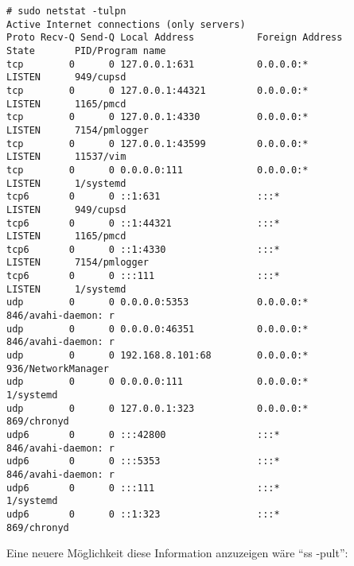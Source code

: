\begin{verbatim}
# sudo netstat -tulpn
Active Internet connections (only servers)
Proto Recv-Q Send-Q Local Address           Foreign Address         State       PID/Program name    
tcp        0      0 127.0.0.1:631           0.0.0.0:*               LISTEN      949/cupsd           
tcp        0      0 127.0.0.1:44321         0.0.0.0:*               LISTEN      1165/pmcd           
tcp        0      0 127.0.0.1:4330          0.0.0.0:*               LISTEN      7154/pmlogger       
tcp        0      0 127.0.0.1:43599         0.0.0.0:*               LISTEN      11537/vim           
tcp        0      0 0.0.0.0:111             0.0.0.0:*               LISTEN      1/systemd           
tcp6       0      0 ::1:631                 :::*                    LISTEN      949/cupsd           
tcp6       0      0 ::1:44321               :::*                    LISTEN      1165/pmcd           
tcp6       0      0 ::1:4330                :::*                    LISTEN      7154/pmlogger       
tcp6       0      0 :::111                  :::*                    LISTEN      1/systemd           
udp        0      0 0.0.0.0:5353            0.0.0.0:*                           846/avahi-daemon: r 
udp        0      0 0.0.0.0:46351           0.0.0.0:*                           846/avahi-daemon: r 
udp        0      0 192.168.8.101:68        0.0.0.0:*                           936/NetworkManager  
udp        0      0 0.0.0.0:111             0.0.0.0:*                           1/systemd           
udp        0      0 127.0.0.1:323           0.0.0.0:*                           869/chronyd         
udp6       0      0 :::42800                :::*                                846/avahi-daemon: r 
udp6       0      0 :::5353                 :::*                                846/avahi-daemon: r 
udp6       0      0 :::111                  :::*                                1/systemd           
udp6       0      0 ::1:323                 :::*                                869/chronyd   
\end{verbatim}

Eine neuere Möglichkeit diese Information anzuzeigen wäre  ``ss -pult'':

